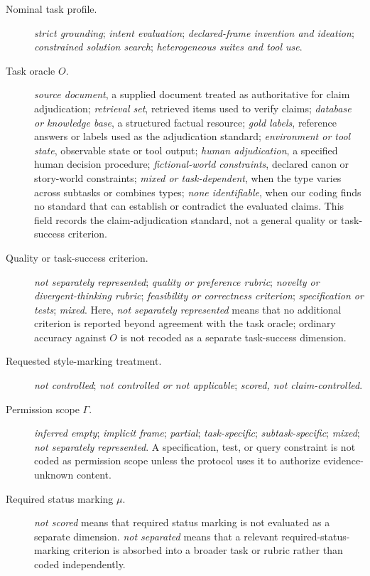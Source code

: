 \documentclass{clv2025}
\begin{document}
\begin{description}
  \item[Nominal task profile.]
  \emph{strict grounding};
  \emph{intent evaluation};
  \emph{declared-frame invention and ideation};
  \emph{constrained solution search};
  \emph{heterogeneous suites and tool use}.

  \item[Task oracle $O$.]
  \emph{source document}, a supplied document treated as authoritative for
  claim adjudication;
  \emph{retrieval set}, retrieved items used to verify claims;
  \emph{database or knowledge base}, a structured factual resource;
  \emph{gold labels}, reference answers or labels used as the adjudication
  standard;
  \emph{environment or tool state}, observable state or tool output;
  \emph{human adjudication}, a specified human decision procedure;
  \emph{fictional-world constraints}, declared canon or story-world
  constraints;
  \emph{mixed or task-dependent}, when the type varies across subtasks or
  combines types;
  \emph{none identifiable}, when our coding finds no standard that can
  establish or contradict the evaluated claims.
  This field records the claim-adjudication standard, not a general quality or
  task-success criterion.

  \item[Quality or task-success criterion.]
  \emph{not separately represented};
  \emph{quality or preference rubric};
  \emph{novelty or divergent-thinking rubric};
  \emph{feasibility or correctness criterion};
  \emph{specification or tests};
  \emph{mixed}.
  Here, \emph{not separately represented} means that no additional criterion
  is reported beyond agreement with the task oracle; ordinary accuracy against
  $O$ is not recoded as a separate task-success dimension.

  \item[Requested style-marking treatment.]
  \emph{not controlled};
  \emph{not controlled or not applicable};
  \emph{scored, not claim-controlled}.

  \item[Permission scope $\Gamma$.]
  \emph{inferred empty};
  \emph{implicit frame};
  \emph{partial};
  \emph{task-specific};
  \emph{subtask-specific};
  \emph{mixed};
  \emph{not separately represented}.
  A specification, test, or query constraint is not coded as permission scope
  unless the protocol uses it to authorize evidence-unknown content.

  \item[Required status marking $\mu$.]
  \emph{not scored} means that required status marking is not evaluated as a
  separate dimension.
  \emph{not separated} means that a relevant required-status-marking criterion
  is absorbed into a broader task or rubric rather than coded independently.
\end{description}
\end{document}
